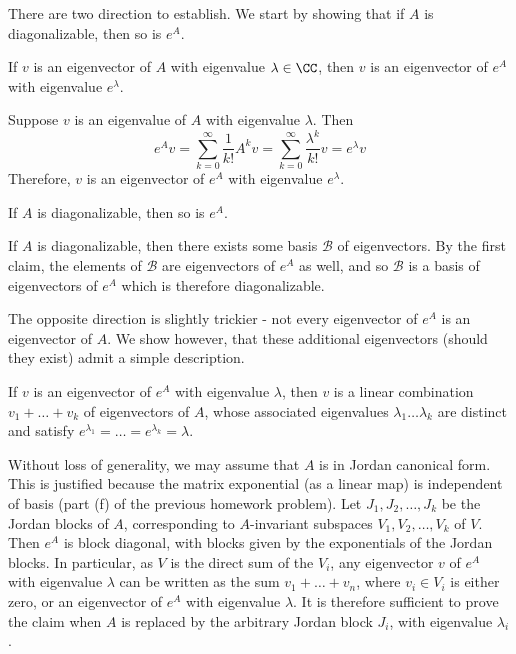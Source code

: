 \documentclass{scrartcl}
\begin{document}

\begin{solution} 
        There are two direction to establish. We start by showing that if $A$ is diagonalizable, then so is $e^A$.
        \begin{claimbox}
        If $v$ is an eigenvector of $A$ with eigenvalue $\lambda\in \CC$, then $v$ is an eigenvector of $e^A$ with eigenvalue $e^\lambda$.
        \end{claimbox}
        \begin{subproof}
        Suppose $v$ is an eigenvalue of $A$ with eigenvalue $\lambda$. Then 
        \[e^Av=\sum_{k=0}^{\infty}\frac{1}{k!}A^kv=\sum_{k=0}^{\infty}\frac{\lambda^k}{k!}v=e^\lambda v\]
        Therefore, $v$ is an eigenvector of $e^A$
         with eigenvalue $e^\lambda$.
         \end{subproof}
        
        \begin{claimbox}
        If $A$ is diagonalizable, then so is $e^A$.
        \end{claimbox}
        \begin{subproof}
        If $A$ is diagonalizable, then there exists some basis $\mathcal{B}$ of eigenvectors. By the first claim, the elements of $\mathcal{B}$ are eigenvectors of $e^A$ as well, and so $\mathcal{B}$ is a basis of eigenvectors of $e^A$ which is therefore diagonalizable.
        \end{subproof}
        
        The opposite direction is slightly trickier - not every eigenvector of $e^A$ is an eigenvector of $A$. We show however, that these additional eigenvectors (should they exist) admit a simple description. 
        
        \begin{claimbox}
        If $v$ is an eigenvector of $e^A$ with eigenvalue $\lambda$, then $v$ is a linear combination $v_1+\dots +v_k$ of eigenvectors of $A$, whose associated eigenvalues $\lambda_1\dots \lambda_k$ are distinct and satisfy $e^{\lambda_1}=\dots=e^{\lambda_k}=\lambda$.
        \end{claimbox}
            
        \begin{subproof}
        Without loss of generality, we may assume that $A$ is in Jordan canonical form. This is justified because the matrix exponential (as a linear map) is independent of basis (part (f) of the previous homework problem). Let $J_1,J_2,\dots, J_k$ be the Jordan blocks of $A$, corresponding to $A$-invariant subspaces $V_1,V_2,\dots, V_k$ of $V$. Then $e^A$ is block diagonal, with blocks given by the exponentials of the Jordan blocks. In particular, as $V$ is the direct sum of the $V_i$, any eigenvector $v$ of $e^A$ with eigenvalue $\lambda$ can be written as the sum $v_1+\dots + v_n$, where $v_i\in V_i$ is either zero, or an eigenvector of $e^A$ with eigenvalue $\lambda$. It is therefore sufficient to prove the claim when $A$ is replaced by the arbitrary Jordan block $J_i$, with eigenvalue $\lambda_i$.
        

\end{subproof}
\end{solution}
\end{document}
